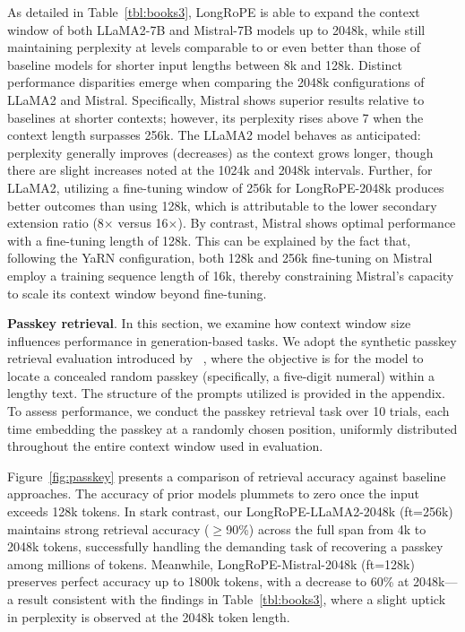As detailed in Table~\ref{tbl:books3}, LongRoPE is able to expand the context window of both LLaMA2-7B and Mistral-7B models up to 2048k, while still maintaining perplexity at levels comparable to or even better than those of baseline models for shorter input lengths between 8k and 128k. Distinct performance disparities emerge when comparing the 2048k configurations of LLaMA2 and Mistral. Specifically, Mistral shows superior results relative to baselines at shorter contexts; however, its perplexity rises above 7 when the context length surpasses 256k. The LLaMA2 model behaves as anticipated: perplexity generally improves (decreases) as the context grows longer, though there are slight increases noted at the 1024k and 2048k intervals. Further, for LLaMA2, utilizing a fine-tuning window of 256k for LongRoPE-2048k produces better outcomes than using 128k, which is attributable to the lower secondary extension ratio (8$\times$ versus 16$\times$). By contrast, Mistral shows optimal performance with a fine-tuning length of 128k. This can be explained by the fact that, following the YaRN configuration, both 128k and 256k fine-tuning on Mistral employ a training sequence length of 16k, thereby constraining Mistral's capacity to scale its context window beyond fine-tuning.

\textbf{Passkey retrieval}. In this section, we examine how context window size influences performance in generation-based tasks. We adopt the synthetic passkey retrieval evaluation introduced by ~\cite{passkey}, where the objective is for the model to locate a concealed random passkey (specifically, a five-digit numeral) within a lengthy text. The structure of the prompts utilized is provided in the appendix. To assess performance, we conduct the passkey retrieval task over 10 trials, each time embedding the passkey at a randomly chosen position, uniformly distributed throughout the entire context window used in evaluation.

Figure~\ref{fig:passkey} presents a comparison of retrieval accuracy against baseline approaches. The accuracy of prior models plummets to zero once the input exceeds 128k tokens. In stark contrast, our LongRoPE-LLaMA2-2048k (ft=256k) maintains strong retrieval accuracy ($\ge$90\%) across the full span from 4k to 2048k tokens, successfully handling the demanding task of recovering a passkey among millions of tokens. Meanwhile, LongRoPE-Mistral-2048k (ft=128k) preserves perfect accuracy up to 1800k tokens, with a decrease to 60\% at 2048k—a result consistent with the findings in Table~\ref{tbl:books3}, where a slight uptick in perplexity is observed at the 2048k token length.


